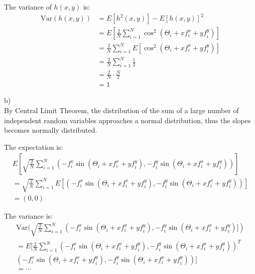 \documentclass{article}
\begin{document}
    The variance of $h(x,y)$ is:
    \begin{align*}
        \text{Var}(h(x,y)) &= E[h^2(x,y)] - E[h(x,y)]^2\\
        &= E[\frac{2}{N} \sum_{i=1}^{N} \cos^2(\Theta_i + x f_i^x + y f_i^y)]\\
        &= \frac{2}{N} \sum_{i=1}^{N} E[\cos^2(\Theta_i + x f_i^x + y f_i^y)]\\
        &= \frac{2}{N} \sum_{i=1}^{N} \frac{1}{2}\\
        &= \frac{2}{N} \cdot \frac{N}{2}\\
        &= 1
    \end{align*}

    b)\\
    By Central Limit Theorem, the distribution of the sum of a large number of independent random variables approaches a normal distribution, thus the slopes becomes normally distributed.

    The expectation is:
    \begin{align*}
        E[\sqrt{\frac{2}{N}} \sum_{i=1}^{N} (-f_i^x \sin(\Theta_i + x f_i^x + y f_i^y), -f_i^y \sin(\Theta_i + x f_i^x + y f_i^y))]\\ 
        = \sqrt{\frac{2}{N}} \sum_{i=1}^{N} E[(-f_i^x \sin(\Theta_i + x f_i^x + y f_i^y), -f_i^y \sin(\Theta_i + x f_i^x + y f_i^y))]\\
        = (0, 0)
    \end{align*}

    The variance is:
    \begin{align*}
        \text{Var}(\sqrt{\frac{2}{N}} \sum_{i=1}^{N} (-f_i^x \sin(\Theta_i + x f_i^x + y f_i^y), -f_i^y \sin(\Theta_i + x f_i^x + y f_i^y)])\\
        = E[\frac{2}{N} \sum_{i=1}^{N} (-f_i^x \sin(\Theta_i + x f_i^x + y f_i^y), -f_i^y \sin(\Theta_i + x f_i^x + y f_i^y))^T\\
        (-f_i^x \sin(\Theta_i + x f_i^x + y f_i^y), -f_i^y \sin(\Theta_i + x f_i^x + y f_i^y))]\\
        = \cdots
    \end{align*}
    
\end{document}
